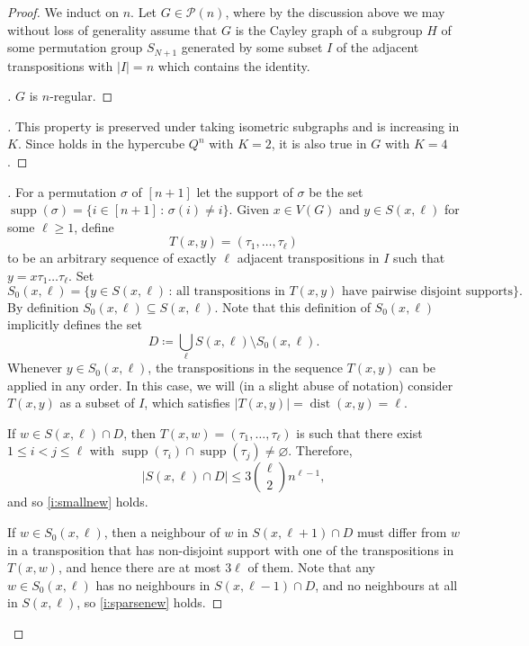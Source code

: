 \documentclass[10pt,a4paper]{amsart}
\newcommand{\dist}{\operatorname{dist}}
\newcommand{\supp}{\operatorname{supp}}
\renewcommand{\emptyset}{\varnothing}
\renewcommand{\geq}{\geqslant}
\renewcommand{\leq}{\leqslant}
\begin{document}
\begin{proof}
  We induct on $n$.
  Let $G \in \mathcal{P}(n)$, where by the discussion above we may without loss of generality assume that $G$ is the Cayley graph of a subgroup $H$ of some permutation group $S_{N+1}$ generated by some subset $I$ of the adjacent transpositions with $|I|=n$ which contains the identity.

  \begin{proof}[]\let\qed\relax
    $G$ is $n$-regular.
  \end{proof}

  \begin{proof}[]\let\qed\relax
    This property is preserved under taking isometric subgraphs and is increasing in $K$. Since  holds in the hypercube $Q^n$ with $K=2$, it is also true in $G$ with $K=4$.
  \end{proof}

  \begin{proof}[]\let\qed\relax
    For a permutation $\sigma$ of $[n+1]$ let the support of $\sigma$ be the set $\supp(\sigma)=\{i \in [n+1] \,:\, \sigma(i)\neq i\}$.
    Given $x \in V(G)$ and $y \in S(x, \ell)$ for some $\ell \geq 1$, define
    \[
      T(x,y) = (\tau_1,\dots, \tau_{\ell})
    \]
    to be an arbitrary sequence of exactly $\ell$ adjacent transpositions in $I$ such that $y = x\tau_1 \dots \tau_\ell$.
    Set
    \[
      S_0(x, \ell)= \{y \in S(x,\ell) \,:\, \text{all transpositions in $T(x,y)$ have pairwise disjoint supports}\}.
    \]
    By definition $S_0(x,\ell) \subseteq S(x, \ell)$. Note that this definition of $S_0(x,\ell)$ implicitly defines the set
    \[
      D \coloneqq \bigcup_{\ell} S(x,\ell) \setminus S_0(x, \ell).
    \]
    Whenever $y \in S_0(x, \ell)$, the transpositions in the sequence $T(x, y)$ can be applied in any order.
    In this case, we will (in a slight abuse of notation) consider $T(x,y)$ as a subset of $I$, which satisfies $|T(x,y)| = \dist(x,y)=\ell$.


    If $w \in S(x,\ell) \cap D$, then $T(x, w) = (\tau_1, \ldots, \tau_\ell)$ is such that there exist $1 \leq i < j \leq \ell$ with $\supp(\tau_i)\cap\supp(\tau_j)\neq\emptyset$.
    Therefore,
    \[
      |S(x,\ell) \cap D| \leq 3 \binom{\ell}{2} n^{\ell-1},
    \]
    and so \ref{i:smallnew} holds.

    If $w \in S_0(x, \ell)$, then a neighbour of $w$ in $S(x, \ell+1) \cap D$ must differ from $w$ in a transposition that has non-disjoint support with one of the transpositions in $T(x, w)$, and hence there are at most $3 \ell$ of them.
    Note that any $w \in S_0(x, \ell)$ has no neighbours in $S(x, \ell-1) \cap D$, and no neighbours at all in $S(x,\ell)$, so \ref{i:sparsenew} holds.


\end{proof}
\end{proof}
\end{document}

